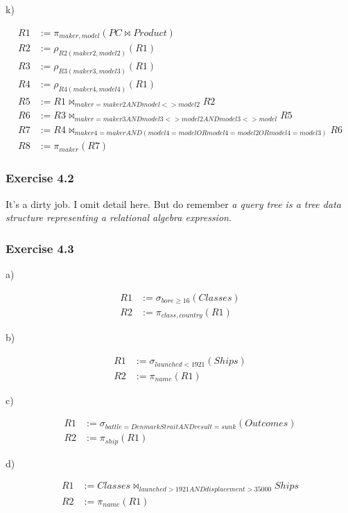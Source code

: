 k)

\begin{align*}
  R1 &:= \pi_{maker, model}(PC \bowtie Product) \\
  R2 &:= \rho_{R2(maker2, model2)}(R1) \\
  R3 &:= \rho_{R3(maker3, model3)}(R1) \\
  R4 &:= \rho_{R4(maker4, model4)}(R1) \\
  R5 &:= R1 \bowtie_{maker=maker2 AND model <> model2} R2 \\
  R6 &:= R3 \bowtie_{maker=maker3 AND model3 <> model2
         AND model3 <> model}R5 \\
  R7 &:= R4 \bowtie_{maker4=maker AND (model4 = model OR
         model4 = model2 OR model4 = model3)} R6 \\
  R8 &:= \pi_{maker}(R7)
\end{align*}

\subsubsection*{Exercise 4.2}

It's a dirty job. I omit detail here. But do remember
\emph{a query tree is a tree data structure representing
a relational algebra expression}.

\subsubsection*{Exercise 4.3}

a)

\begin{align*}
  R1 &:= \sigma_{bore \geq 16}(Classes) \\
  R2 &:= \pi_{class,country}(R1)
\end{align*}

b)

\begin{align*}
  R1 &:= \sigma_{launched < 1921}(Ships) \\
  R2 &:= \pi_{name}(R1)
\end{align*}

c)

\begin{align*}
  R1 &:= \sigma_{battle=DenmarkStrait AND result=sunk}
         (Outcomes) \\
  R2 &:= \pi_{ship}(R1)
\end{align*}

d)

\begin{align*}
  R1 &:= Classes \bowtie_{launched > 1921 AND
         displacement > 35000} Ships \\
  R2 &:= \pi_{name}(R1)
\end{align*}

